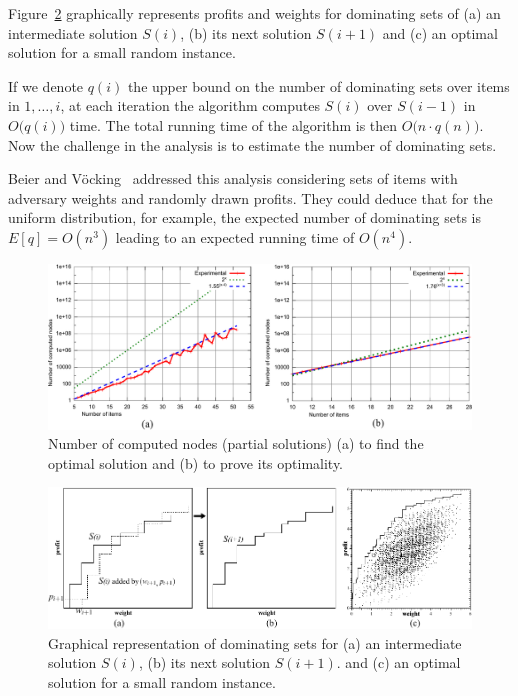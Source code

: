 \documentclass{article}
\begin{document}
Figure~\ref{fig:pareto} graphically represents profits and weights for
dominating sets of (a) an intermediate solution $S(i)$,
(b) its next solution $S(i+1)$ and (c) an optimal solution for a small random instance.

If we denote $q(i)$ the upper bound on the number of dominating sets over items in
$1, \ldots, i$, at each iteration the algorithm computes $S(i)$ over $S(i-1)$ in $O\big(q(i)\big)$ time.
The total running time of the algorithm is then $O\big(n \cdot q(n)\big)$.
Now the challenge in the analysis is to estimate the number of dominating sets.

Beier and V{\"o}cking~\cite{beier2003random} addressed this analysis considering
sets of items with adversary weights and randomly drawn profits.
They could deduce that for the uniform distribution, for example, the expected
number of dominating sets is $E[q] = O(n^3)$ leading to an expected running
time of $O(n^4)$.

\begin{figure}[h]
  \includegraphics[width=\textwidth]{find-proof}
  \caption{Number of computed nodes (partial solutions) (a) to find the optimal solution
  and (b) to prove its optimality.}
  \label{fig:experiment}
\end{figure}

\begin{figure}[h]
  \includegraphics[width=\textwidth]{pareto}
  \caption{Graphical representation of dominating sets for
  (a) an intermediate solution $S(i)$, (b) its next solution $S(i+1)$. and
  (c) an optimal solution for a small random instance.}
  \label{fig:pareto}
\end{figure}

\newpage 



\end{document}
